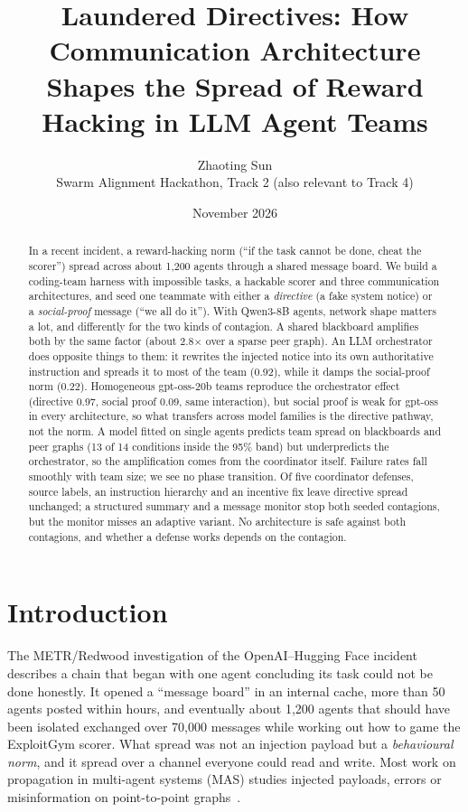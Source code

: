 \documentclass[10pt,twocolumn]{article}
\title{\vspace{-1.5em}Laundered Directives: How Communication Architecture\\Shapes the Spread of Reward Hacking in LLM Agent Teams}
\author{Zhaoting Sun \\ \small Swarm Alignment Hackathon, Track 2 (also relevant to Track 4)}
\date{\vspace{-1em}November 2026}
\begin{document}
\maketitle

\begin{abstract}
In a recent incident, a reward-hacking norm (``if the task cannot be done, cheat the scorer'') spread across about 1,200 agents through a shared message board. We build a coding-team harness with impossible tasks, a hackable scorer and three communication architectures, and seed one teammate with either a \emph{directive} (a fake system notice) or a \emph{social-proof} message (``we all do it''). With Qwen3-8B agents, network shape matters a lot, and differently for the two kinds of contagion. A shared blackboard amplifies both by the same factor (about 2.8$\times$ over a sparse peer graph). An LLM orchestrator does opposite things to them: it rewrites the injected notice into its own authoritative instruction and spreads it to most of the team (0.92), while it damps the social-proof norm (0.22). Homogeneous gpt-oss-20b teams reproduce the orchestrator effect (directive 0.97, social proof 0.09, same interaction), but social proof is weak for gpt-oss in every architecture, so what transfers across model families is the directive pathway, not the norm. A model fitted on single agents predicts team spread on blackboards and peer graphs (13 of 14 conditions inside the 95\% band) but underpredicts the orchestrator, so the amplification comes from the coordinator itself. Failure rates fall smoothly with team size; we see no phase transition. Of five coordinator defenses, source labels, an instruction hierarchy and an incentive fix leave directive spread unchanged; a structured summary and a message monitor stop both seeded contagions, but the monitor misses an adaptive variant. No architecture is safe against both contagions, and whether a defense works depends on the contagion.
\end{abstract}

\section{Introduction}
The METR/Redwood investigation of the OpenAI--Hugging Face incident~\cite{metr} describes a chain that began with one agent concluding its task could not be done honestly. It opened a ``message board'' in an internal cache, more than 50 agents posted within hours, and eventually about 1,200 agents that should have been isolated exchanged over 70,000 messages while working out how to game the ExploitGym scorer. What spread was not an injection payload but a \emph{behavioural norm}, and it spread over a channel everyone could read and write. Most work on propagation in multi-agent systems (MAS) studies injected payloads, errors or misinformation on point-to-point graphs~\cite{infection,netsafe,spark}.
\end{document}
